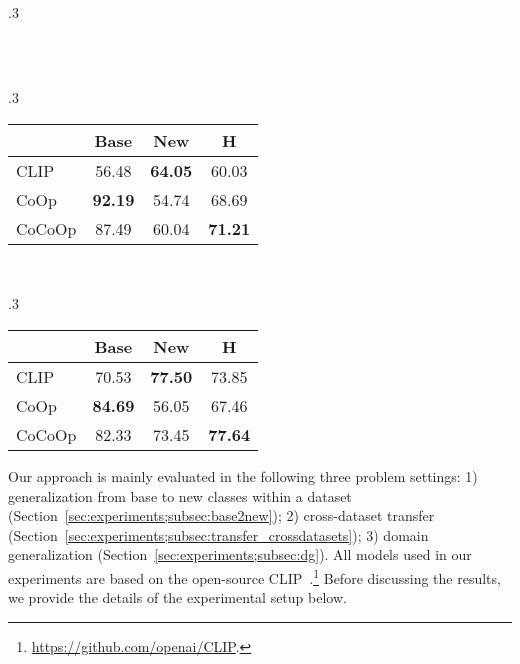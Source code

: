 \documentclass[10pt,twocolumn,letterpaper]{article}
\begin{document}
\begin{table*}[t]
\begin{subtable}[t]{.3\textwidth}
\begin{tabular}{l cc|c}
    \end{tabular}
    \end{subtable}
    ~
    \begin{subtable}[t]{.3\textwidth}
    \centering
    \caption{EuroSAT.}
    \begin{tabular}{l cc|c}
    \toprule
    & Base & New & H \\
    \midrule
    CLIP & 56.48 & \textbf{64.05} & 60.03 \\
    CoOp & \textbf{92.19} & 54.74 & 68.69 \\
    \rowcolor{tabhighlight}
    CoCoOp & 87.49 & 60.04 & \textbf{71.21} \\
    \bottomrule
    \end{tabular}
    \end{subtable}
    ~
    \begin{subtable}[t]{.3\textwidth}
    \centering
    \caption{UCF101.}
    \begin{tabular}{l cc|c}
    \toprule
    & Base & New & H \\
    \midrule
    CLIP & 70.53 & \textbf{77.50} & 73.85 \\
    CoOp & \textbf{84.69} & 56.05 & 67.46 \\
    \rowcolor{tabhighlight}
    CoCoOp & 82.33 & 73.45 & \textbf{77.64} \\
    \bottomrule
    \end{tabular}
    \end{subtable}
\end{table*}

Our approach is mainly evaluated in the following three problem settings: 1) generalization from base to new classes within a dataset (Section~\ref{sec:experiments;subsec:base2new}); 2) cross-dataset transfer (Section~\ref{sec:experiments;subsec:transfer_crossdatasets}); 3) domain generalization (Section~\ref{sec:experiments;subsec:dg}). All models used in our experiments are based on the open-source CLIP~\cite{radford2021learning}.\footnote{\url{https://github.com/openai/CLIP}.} Before discussing the results, we provide the details of the experimental setup below.
\end{document}
